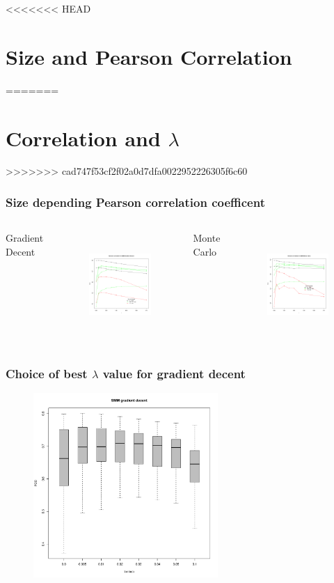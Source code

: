 \documentclass[presentation]{beamer}   %
\begin{document}
\begin{frame}
<<<<<<< HEAD
\section{Size and Pearson Correlation}
=======
\section{Correlation and $\lambda$}
>>>>>>> cad747f53cf2f02a0d7dfa0022952226305f6c60
\begin{frame}
  \frametitle{Size depending Pearson correlation coefficent}
  \begin{columns}[t] %
		\centering Gradient Decent
		\begin{figure}
		\centering
			\includegraphics[width=40mm,height=40mm]{fig/smm_l005_ppc_size.pdf}
		\end{figure}
		\centering Monte Carlo
		\begin{figure}
			\centering
			\includegraphics[width=40mm,height=40mm]{fig/smm_mc_l005_ppc_size.pdf}
		\end{figure}
  \end{columns}
\end{frame}

\begin{frame}
  \frametitle{Choice of best $\lambda$ value for gradient decent}
	\begin{figure}
	\centering
		\includegraphics[width=70mm,height=70mm]{fig/choice_lambda.pdf}
	\end{figure}
\end{frame}


\end{frame}
\end{document}
